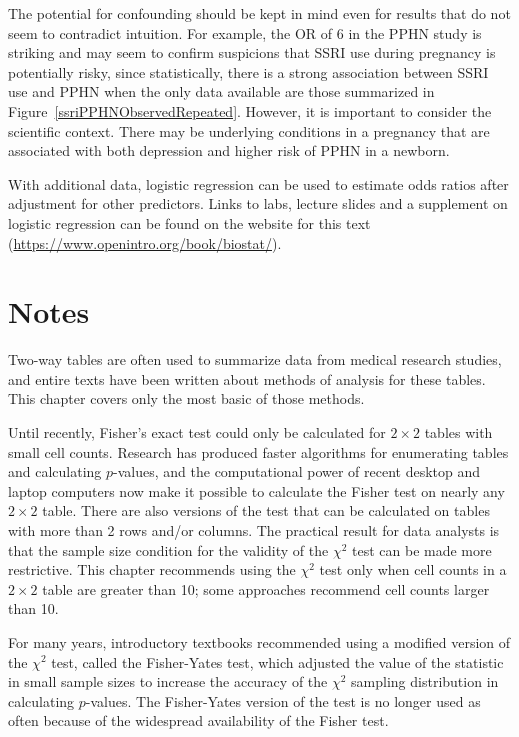 The potential for confounding should be kept in mind even for results that do not seem to contradict intuition. For example, the OR of 6 in the PPHN study is striking and may seem to confirm suspicions that SSRI use during pregnancy is potentially risky, since statistically, there is a strong association between SSRI use and PPHN when the only data available are those summarized in Figure~\ref{ssriPPHNObservedRepeated}. However, it is important to consider the scientific context. There may be underlying conditions in a pregnancy that are associated with both depression and higher risk of PPHN in a newborn.

With additional data, logistic regression can be used to estimate odds ratios after adjustment for other predictors. Links to labs, lecture slides and a supplement on logistic regression can be found on the website for this text (\url{https://www.openintro.org/book/biostat/}).


\section{Notes}
\label{infForPropNotes}

Two-way tables are often used to summarize data from medical research studies, and entire texts have been written about methods of analysis for these tables.  This chapter covers only the most basic of those methods. 

Until recently, Fisher's exact test could only be calculated for $2 \times 2$ tables with small cell counts. Research has produced faster algorithms for enumerating tables and calculating $p$-values, and the computational power of recent desktop and laptop computers now make it possible to calculate the Fisher test on nearly any $2 \times 2$ table.  There are also versions of the test that can be calculated on tables with more than 2 rows and/or columns.  The practical result for data analysts is that the sample size condition for the validity of the $\chi^2$ test can be made more restrictive.  This chapter recommends using the $\chi^2$ test only when cell counts in a $2 \times 2$ table are greater than 10; some approaches recommend cell counts larger than 10.

For many years, introductory textbooks recommended using a modified version of the $\chi^2$ test, called the Fisher-Yates test, which adjusted the value of the statistic in small sample sizes to increase the accuracy of the $\chi^2$ sampling distribution in calculating $p$-values.  The Fisher-Yates version of the test is no longer used as often because of the widespread availability of the Fisher test.

